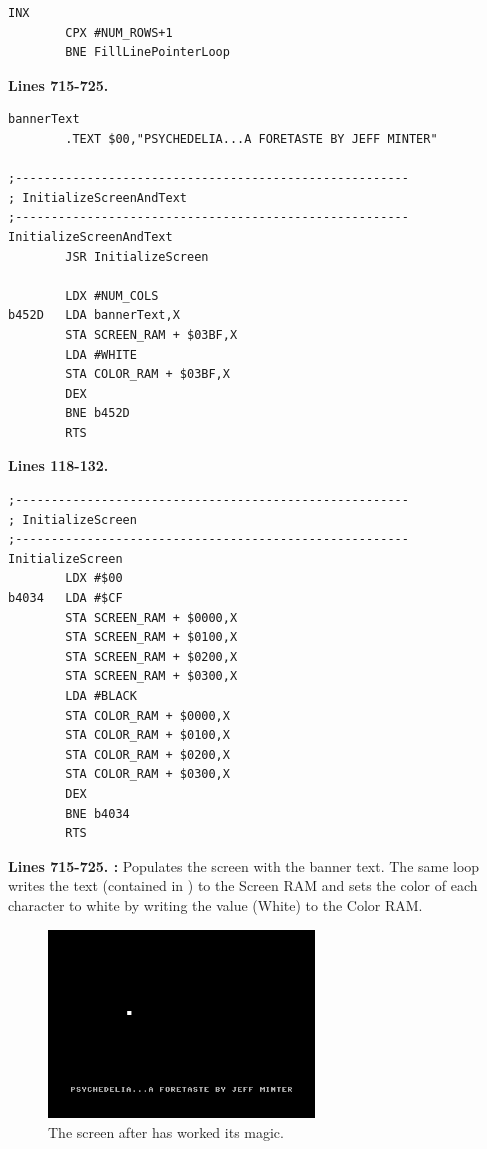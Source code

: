 \begin{lstlisting}[escapechar=\%]
        INX 
        CPX #NUM_ROWS+1
        BNE FillLinePointerLoop
\end{lstlisting}
%

\clearpage
\textbf{Lines 715-725. }
\begin{lstlisting}[caption = A routine that fills the screen with black and the title text.,escapechar=\%]
bannerText   
        .TEXT $00,"PSYCHEDELIA...A FORETASTE BY JEFF MINTER"

;-------------------------------------------------------
; InitializeScreenAndText
;-------------------------------------------------------
InitializeScreenAndText   
        JSR InitializeScreen

        LDX #NUM_COLS
b452D   LDA bannerText,X
        STA SCREEN_RAM + $03BF,X
        LDA #WHITE
        STA COLOR_RAM + $03BF,X
        DEX 
        BNE b452D
        RTS 
\end{lstlisting}

\bigskip
\bigskip
\bigskip
\bigskip
\bigskip
\textbf{Lines 118-132. }
\begin{lstlisting}[caption = Fills the screen with black,escapechar=\%]
;-------------------------------------------------------
; InitializeScreen
;-------------------------------------------------------
InitializeScreen   
        LDX #$00
b4034   LDA #$CF
        STA SCREEN_RAM + $0000,X
        STA SCREEN_RAM + $0100,X
        STA SCREEN_RAM + $0200,X
        STA SCREEN_RAM + $0300,X
        LDA #BLACK
        STA COLOR_RAM + $0000,X
        STA COLOR_RAM + $0100,X
        STA COLOR_RAM + $0200,X
        STA COLOR_RAM + $0300,X
        DEX 
        BNE b4034
        RTS 

\end{lstlisting}
\clearpage

\textbf{Lines 715-725. :} Populates the screen with the banner text. The same loop writes
the text (contained in ) to the Screen RAM and sets the color of each character to white by writing the
value  (White) to the Color RAM.

\begin{figure}[H]
    \centering
      \includegraphics[height=5cm]{src/listing_commentary/foretaste.png}
  \caption*{The screen after  has worked its magic.}
\end{figure}

